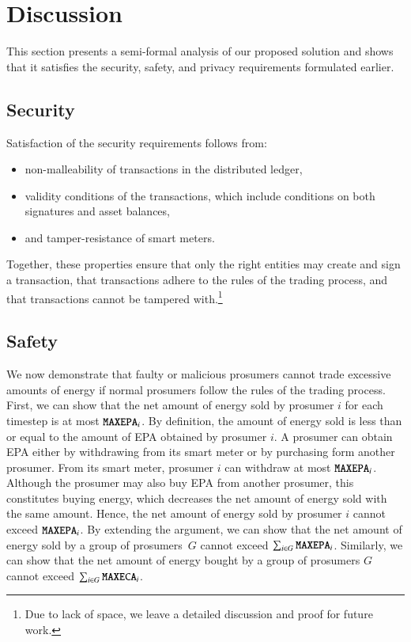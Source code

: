 \section{Discussion}
\label{sec:discussion}

This section presents a semi-formal analysis of our proposed solution
and shows that it satisfies the security, safety, and privacy
requirements formulated earlier.

\subsection{Security}
Satisfaction of the security requirements follows from:
\begin{itemize}[noitemsep,topsep=-\parskip]
\item non-malleability of transactions in the distributed ledger,
\item validity conditions of the transactions, which include conditions on both signatures and asset balances,
\item and tamper-resistance of smart meters.
\end{itemize}
Together, these properties ensure that only the right entities may
create and sign a transaction, that transactions adhere to the rules
of the trading process, and that transactions cannot be tampered
with.\footnote{Due to lack of space, we leave a detailed discussion
  and proof for future work.}

\subsection{Safety}
We now demonstrate that faulty or malicious prosumers cannot trade
excessive amounts of energy if normal prosumers follow the rules of
the trading process.
%
First, we can show that the net amount of energy sold by prosumer $i$ for
each timestep is at most $\texttt{MAXEPA}_i$.  By definition, the
amount of energy sold is less than or equal to the amount of EPA
obtained by prosumer $i$.  A prosumer can obtain EPA either by
withdrawing from its smart meter or by purchasing form another
prosumer.  From its smart meter, prosumer $i$ can withdraw at most
$\texttt{MAXEPA}_i$.
Although the prosumer may also buy EPA from another prosumer, this
constitutes buying energy, which decreases the net amount of energy
sold with the same amount.
Hence, the net amount of energy sold by prosumer $i$ cannot exceed
$\texttt{MAXEPA}_i$.  By extending the argument, we can show that the net
amount of energy sold by a group of prosumers~$G$ cannot exceed
$\sum_{i \in G} \texttt{MAXEPA}_i$.  Similarly, we can show that the net
amount of energy bought by a group of prosumers $G$ cannot exceed
$\sum_{i \in G} \texttt{MAXECA}_i$.


